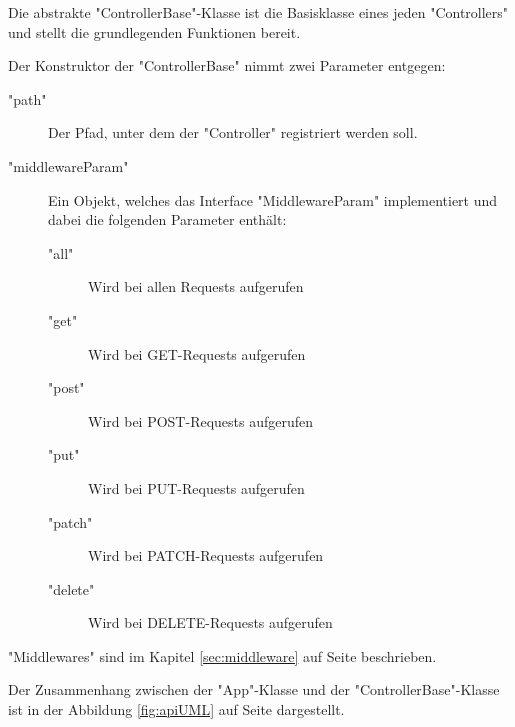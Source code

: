 
Die abstrakte "ControllerBase"-Klasse ist die Basisklasse eines jeden "Controllers" und stellt die grundlegenden Funktionen bereit. 

Der Konstruktor der "ControllerBase" nimmt zwei Parameter entgegen:

\begin{description}
    \item["path"] Der Pfad, unter dem der "Controller" registriert werden soll.
    \item["middlewareParam"] Ein Objekt, welches das Interface "MiddlewareParam" implementiert und dabei die folgenden Parameter enthält:
    \begin{description}
        \item["all"] Wird bei allen Requests aufgerufen
        \item["get"] Wird bei GET-Requests aufgerufen
        \item["post"] Wird bei POST-Requests aufgerufen
        \item["put"] Wird bei PUT-Requests aufgerufen
        \item["patch"] Wird bei PATCH-Requests aufgerufen
        \item["delete"] Wird bei DELETE-Requests aufgerufen
    \end{description}
\end{description}


"Middlewares" sind im Kapitel \ref{sec:middleware} auf Seite \pageref{sec:middleware} beschrieben.

Der Zusammenhang zwischen der "App"-Klasse und der "ControllerBase"-Klasse ist in der Abbildung \ref{fig:apiUML} auf Seite \pageref{fig:apiUML} dargestellt.

